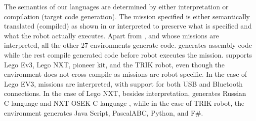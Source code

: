 \parhead{\fsemantics} The semantics of our languages are determined by either interpretation or compilation (target code generation). The mission specified is either semantically translated (compiled) as shown in  or interpreted to preserve what is specified and what the robot actually executes. Apart from \lego, and \codelab whose missions are interpreted, all the other 27 environments generate code. \metabot generates assembly code while the rest compile generated code before robot executes the mission.  \trik supports Lego Ev3, Lego NXT, pioneer kit, and the TRIK robot, even though the environment does not cross-compile as missions are robot specific. In the case of Lego EV3, missions are interpreted, with support for both USB and Bluetooth connections.
In the case of Lego NXT, besides interpretation, \trik generates Russian C language and NXT OSEK C language , while in the case of TRIK robot, the environment generates Java Script, PascalABC, Python, and F\#.%






